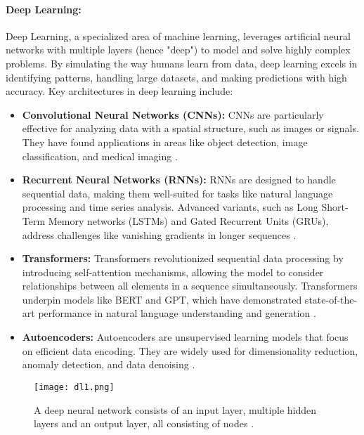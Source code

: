 \paragraph{Deep Learning:} Deep Learning, a specialized area of machine learning, leverages artificial neural networks with multiple layers (hence "deep") to model and solve highly complex problems. By simulating the way humans learn from data, deep learning excels in identifying patterns, handling large datasets, and making predictions with high accuracy. Key architectures in deep learning include: 
\begin{itemize}
    \item \textbf{Convolutional Neural Networks (CNNs):} CNNs are particularly effective for analyzing data with a spatial structure, such as images or signals. They have found applications in areas like object detection, image classification, and medical imaging \cite{lecun1998gradient, lecun2015deep}.
    \item \textbf{Recurrent Neural Networks (RNNs):} RNNs are designed to handle sequential data, making them well-suited for tasks like natural language processing and time series analysis. Advanced variants, such as Long Short-Term Memory networks (LSTMs) and Gated Recurrent Units (GRUs), address challenges like vanishing gradients in longer sequences \cite{hochreiter1997long, cho2014learning}.
    \item \textbf{Transformers:} Transformers revolutionized sequential data processing by introducing self-attention mechanisms, allowing the model to consider relationships between all elements in a sequence simultaneously. Transformers underpin models like BERT and GPT, which have demonstrated state-of-the-art performance in natural language understanding and generation \cite{vaswani2017attention, devlin2018bert}.
    \item \textbf{Autoencoders:} Autoencoders are unsupervised learning models that focus on efficient data encoding. They are widely used for dimensionality reduction, anomaly detection, and data denoising \cite{hinton2006reducing, vincent2010stacked}.
\end{itemize}

\begin{figure}[H]
    \centering
    \texttt{[image: dl1.png]}
    \caption{A deep neural network consists of an input layer, multiple hidden layers and an output layer, all consisting of nodes \cite{quantib_deep_learning_radiology}.}
    \label{fig:dl1}
\end{figure}

